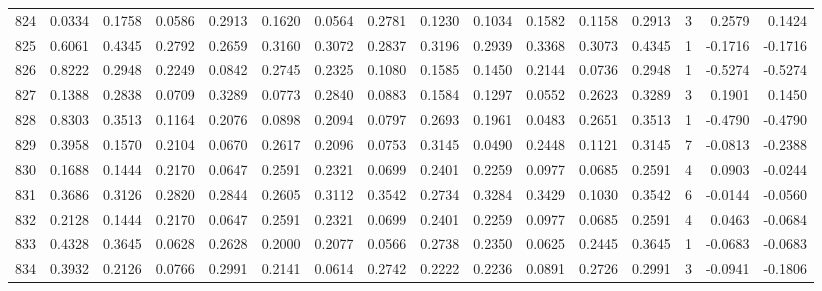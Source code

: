 \begin{tabular}{lrrrrrrrrrrrrrrr}
824 &      0.0334 &  0.1758 &  0.0586 &  0.2913 &  0.1620 &  0.0564 &  0.2781 &  0.1230 &  0.1034 &  0.1582 &   0.1158 &     0.2913 &      3 &                    0.2579 &                     0.1424 \\
825 &      0.6061 &  0.4345 &  0.2792 &  0.2659 &  0.3160 &  0.3072 &  0.2837 &  0.3196 &  0.2939 &  0.3368 &   0.3073 &     0.4345 &      1 &                   -0.1716 &                    -0.1716 \\
826 &      0.8222 &  0.2948 &  0.2249 &  0.0842 &  0.2745 &  0.2325 &  0.1080 &  0.1585 &  0.1450 &  0.2144 &   0.0736 &     0.2948 &      1 &                   -0.5274 &                    -0.5274 \\
827 &      0.1388 &  0.2838 &  0.0709 &  0.3289 &  0.0773 &  0.2840 &  0.0883 &  0.1584 &  0.1297 &  0.0552 &   0.2623 &     0.3289 &      3 &                    0.1901 &                     0.1450 \\
828 &      0.8303 &  0.3513 &  0.1164 &  0.2076 &  0.0898 &  0.2094 &  0.0797 &  0.2693 &  0.1961 &  0.0483 &   0.2651 &     0.3513 &      1 &                   -0.4790 &                    -0.4790 \\
829 &      0.3958 &  0.1570 &  0.2104 &  0.0670 &  0.2617 &  0.2096 &  0.0753 &  0.3145 &  0.0490 &  0.2448 &   0.1121 &     0.3145 &      7 &                   -0.0813 &                    -0.2388 \\
830 &      0.1688 &  0.1444 &  0.2170 &  0.0647 &  0.2591 &  0.2321 &  0.0699 &  0.2401 &  0.2259 &  0.0977 &   0.0685 &     0.2591 &      4 &                    0.0903 &                    -0.0244 \\
831 &      0.3686 &  0.3126 &  0.2820 &  0.2844 &  0.2605 &  0.3112 &  0.3542 &  0.2734 &  0.3284 &  0.3429 &   0.1030 &     0.3542 &      6 &                   -0.0144 &                    -0.0560 \\
832 &      0.2128 &  0.1444 &  0.2170 &  0.0647 &  0.2591 &  0.2321 &  0.0699 &  0.2401 &  0.2259 &  0.0977 &   0.0685 &     0.2591 &      4 &                    0.0463 &                    -0.0684 \\
833 &      0.4328 &  0.3645 &  0.0628 &  0.2628 &  0.2000 &  0.2077 &  0.0566 &  0.2738 &  0.2350 &  0.0625 &   0.2445 &     0.3645 &      1 &                   -0.0683 &                    -0.0683 \\
834 &      0.3932 &  0.2126 &  0.0766 &  0.2991 &  0.2141 &  0.0614 &  0.2742 &  0.2222 &  0.2236 &  0.0891 &   0.2726 &     0.2991 &      3 &                   -0.0941 &                    -0.1806 \\

\end{tabular}
